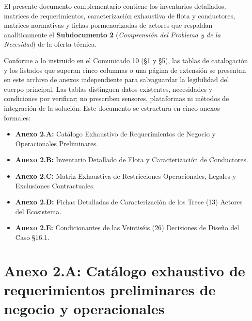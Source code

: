 
El presente documento complementario contiene los inventarios detallados, matrices de requerimientos, caracterización exhaustiva de flota y conductores, matrices normativas y fichas pormenorizadas de actores que respaldan analíticamente el \textbf{Subdocumento 2} (\textit{Comprensión del Problema y de la Necesidad}) de la oferta técnica.

Conforme a lo instruido en el Comunicado 10 (§1 y §5), las tablas de catalogación y los listados que superan cinco columnas o una página de extensión se presentan en este archivo de anexos independiente para salvaguardar la legibilidad del cuerpo principal. Las tablas distinguen datos existentes, necesidades y condiciones por verificar; no prescriben sensores, plataformas ni métodos de integración de la solución. Este documento se estructura en cinco anexos formales:
\begin{itemize}
  \item \textbf{Anexo 2.A:} Catálogo Exhaustivo de Requerimientos de Negocio y Operacionales Preliminares.
  \item \textbf{Anexo 2.B:} Inventario Detallado de Flota y Caracterización de Conductores.
  \item \textbf{Anexo 2.C:} Matriz Exhaustiva de Restricciones Operacionales, Legales y Exclusiones Contractuales.
  \item \textbf{Anexo 2.D:} Fichas Detalladas de Caracterización de los Trece (13) Actores del Ecosistema.
  \item \textbf{Anexo 2.E:} Condicionantes de las Veintiséis (26) Decisiones de Diseño del Caso §16.1.
\end{itemize}

\vspace{0.5cm}

\section*{Anexo 2.A: Catálogo exhaustivo de requerimientos preliminares de negocio y operacionales}\label{sec:2-anexo-2a}

